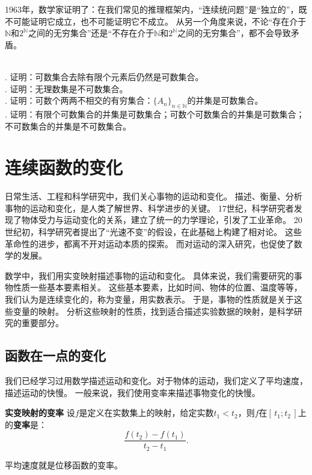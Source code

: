 \documentclass[12pt,UTF8]{ctexbook}
\begin{document}
1963年，数学家证明了：在我们常见的推理框架内，“连续统问题”是“独立的”，既不可能证明它成立，也不可能证明它不成立。
从另一个角度来说，不论“存在介于$\mathbb{N}$和$2^\mathbb{N}$之间的无穷集合”还是“不存在介于$\mathbb{N}$和$2^\mathbb{N}$之间的无穷集合”，都不会导致矛盾。

\begin{xt}
    \mbox{} \\
    . 证明：可数集合去除有限个元素后仍然是可数集合。\\
    . 证明：无理数集是不可数集合。\\
    . 证明：可数个两两不相交的有穷集合：$\{A_n\}_{n\in\mathbb{N}}$的并集是可数集合。\\
    . 证明：有限个可数集合的并集是可数集合；可数个可数集合的并集是可数集合；不可数集合的并集是不可数集合。
\end{xt}

\chapter{连续函数的变化}

日常生活、工程和科学研究中，我们关心事物的运动和变化。
描述、衡量、分析事物的运动和变化，是人类了解世界、科学进步的关键。
17世纪，科学研究者发现了物体受力与运动变化的关系，建立了统一的力学理论，引发了工业革命。
20世纪初，科学研究者提出了“光速不变”的假设，在此基础上构建了相对论。
这些革命性的进步，都离不开对运动本质的探索。
而对运动的深入研究，也促使了数学的发展。

数学中，我们用实变映射描述事物的运动和变化。
具体来说，我们需要研究的事物性质一些基本要素相关。
这些基本要素，比如时间、物体的位置、温度等等，我们认为是连续变化的，称为变量，用实数表示。
于是，事物的性质就是关于这些变量的映射。
分析这些映射的性质，找到适合描述实验数据的映射，是科学研究的重要部分。

\section{函数在一点的变化}
我们已经学习过用数学描述运动和变化。对于物体的运动，我们定义了平均速度，描述运动的快慢。
一般来说，我们使用变率来描述事物变化的快慢。
\begin{df}{\textbf{实变映射的变率}}
    设$f$是定义在实数集上的映射，给定实数$t_1 < t_2$，则$f$在$[\,t_1;t_2\,]$上的\textbf{变率}是：
    $$ \frac{f(t_2) - f(t_1)}{t_2 - t_1}.$$
\end{df}

平均速度就是位移函数的变率。
\end{document}
